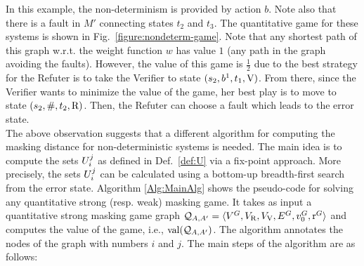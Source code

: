 In this example, the non-determinism is provided by action $b$. Note also that there is a fault in  $M'$ connecting states $t_2$ and $t_3$. The quantitative game for these systems is shown in Fig.~\ref{figure:nondeterm-game}. Note that any shortest path of this graph w.r.t. the weight 
function $w$ has value $1$ (any path in the graph avoiding the faults). However, the value of this game is $\frac{1}{2}$ due to the best 
strategy for the Refuter is to take the Verifier to state $(s_2,b^1,t_1,\mathrm{V})$. 
From there, since the Verifier wants to minimize the value of the game, her best play  is to move to state $(s_2,\#,t_2,\mathrm{R})$. Then, the Refuter can choose a fault which leads to the error state. \\

The above observation suggests that a different algorithm for computing the masking distance for 
non-deterministic systems is needed. 
The main idea is to compute the sets $U^j_i$ as defined in Def.~\ref{def:U} via 
a fix-point approach. More precisely, the sets $U^j_i$ can be calculated using a 
bottom-up breadth-first search from the error state. 
Algorithm \ref{Alg:MainAlg} shows the pseudo-code for solving any quantitative 
strong (resp. weak) masking game. 
It takes as input a quantitative strong masking game graph $\mathcal{Q}_{A, A'} = \langle V^G, V_{\mathrm{R}}, V_{\mathrm{V}},E^G, v_0^G, \operatorname{r}^G \rangle$ 
and computes the value of the game, i.e., $\operatorname{val}(\mathcal{Q}_{A, A'})$.
The algorithm annotates the nodes of the graph with numbers $i$ and $j$. 
The main steps of the algorithm are as follows:


